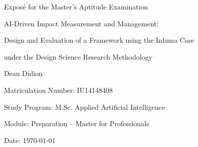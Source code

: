 \documentclass[12pt]{report}
\begin{document}
\begin{titlepage}
    \centering

    {\LARGE Exposé for the Master's Aptitude Examination \par}
    \vspace{0.5cm}
    {\Large AI-Driven Impact Measurement and Management: \par
    Design and Evaluation of a Framework using the Inluma Case \par
    under the Design Science Research Methodology \par}
    \vspace{1.5cm}

    {\large Dean Didion \par}
    Matriculation Number: IU14148408 \par
    \vspace{1.5cm}

    Study Program: M.Sc. Applied Artificial Intelligence \par
    Module: Preparation – Master for Professionals \par
    \vfill

    Date: \today
\end{titlepage}




\tableofcontents
\listoffigures

\newpage















\nocite{*}
\printbibliography

\clearpage

\appendix




\end{document}

